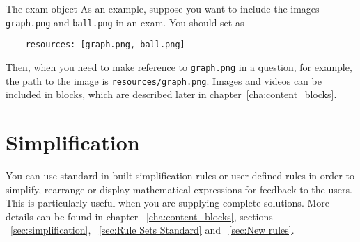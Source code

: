 \begin{chapter}{\label{cha:exam_object}The exam object}
  As an example, suppose you want to include the images \verb"graph.png" and
  \verb"ball.png" in an exam.  You should set  as
  \begin{Verbatim}
    resources: [graph.png, ball.png]
  \end{Verbatim}
  Then, when you need to make reference to \verb"graph.png" in a question, for
  example, the path to the image is \verb"resources/graph.png".  Images and
  videos can be included in  blocks, which are described
  later in chapter~\ref{cha:content_blocks}.
 \section{\label{sec:simplification}Simplification}
 You can use standard in-built simplification rules or user-defined rules in order to simplify, rearrange or display mathematical expressions for feedback to the users. This is particularly useful when you are supplying complete solutions. More details can be found in chapter ~\ref{cha:content_blocks}, sections ~\ref{sec:simplification}, ~\ref{sec:Rule Sets Standard} and  ~\ref{sec:New rules}.

\end{chapter}
